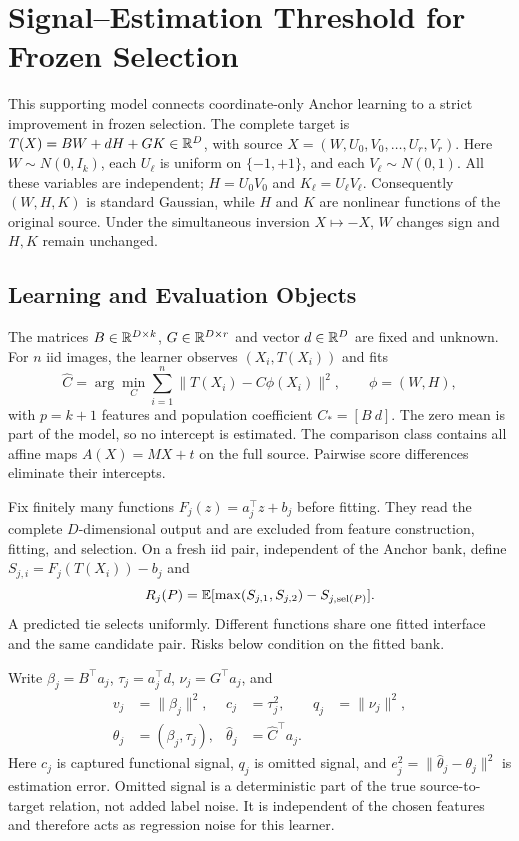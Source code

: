\section{Signal--Estimation Threshold for Frozen Selection}
\label{sec:signalproof}
This supporting model connects coordinate-only Anchor learning to a strict improvement in frozen selection. The complete target is $T(X)=BW+dH+GK\in\mathbb R^D$, with source $X=(W,U_0,V_0,\ldots,U_r,V_r)$. Here $W\sim N(0,I_k)$, each $U_\ell$ is uniform on $\{-1,+1\}$, and each $V_\ell\sim N(0,1)$. All these variables are independent; $H=U_0V_0$ and $K_\ell=U_\ell V_\ell$. Consequently $(W,H,K)$ is standard Gaussian, while $H$ and $K$ are nonlinear functions of the original source. Under the simultaneous inversion $X\mapsto-X$, $W$ changes sign and $H,K$ remain unchanged.

\subsection{Learning and Evaluation Objects}
The matrices $B\in\mathbb R^{D\times k}$, $G\in\mathbb R^{D\times r}$ and vector $d\in\mathbb R^D$ are fixed and unknown. For $n$ iid images, the learner observes $(X_i,T(X_i))$ and fits
\begin{equation}
 \widehat C=\arg\min_C\sum_{i=1}^n\|T(X_i)-C\phi(X_i)\|^2,
 \qquad \phi=(W,H),
\end{equation}
with $p=k+1$ features and population coefficient $C_*=[B\ d]$. The zero mean is part of the model, so no intercept is estimated. The comparison class contains all affine maps $A(X)=MX+t$ on the full source. Pairwise score differences eliminate their intercepts.

Fix finitely many functions $F_j(z)=a_j^\top z+b_j$ before fitting. They read the complete $D$-dimensional output and are excluded from feature construction, fitting, and selection. On a fresh iid pair, independent of the Anchor bank, define $S_{j,i}=F_j(T(X_i))-b_j$ and
\begin{equation}
 R_j(P)=\mathbb E[\max(S_{j,1},S_{j,2})-S_{j,\operatorname{sel}(P)}].
\end{equation}
A predicted tie selects uniformly. Different functions share one fitted interface and the same candidate pair. Risks below condition on the fitted bank.

Write $\beta_j=B^\top a_j$, $\tau_j=a_j^\top d$, $\nu_j=G^\top a_j$, and
\begin{align}
 v_j&=\|\beta_j\|^2,&c_j&=\tau_j^2,&q_j&=\|\nu_j\|^2,\\
 \theta_j&=(\beta_j,\tau_j),&\widehat\theta_j&=\widehat C^\top a_j.
\end{align}
Here $c_j$ is captured functional signal, $q_j$ is omitted signal, and $e_j^2=\|\widehat\theta_j-\theta_j\|^2$ is estimation error. Omitted signal is a deterministic part of the true source-to-target relation, not added label noise. It is independent of the chosen features and therefore acts as regression noise for this learner.

